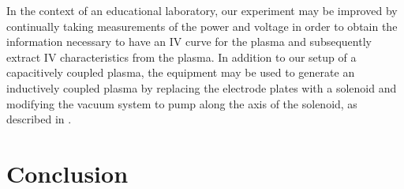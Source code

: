 \documentclass[reprint]{revtex4-1}
\begin{document}
In the context of an educational laboratory, our experiment may be improved by continually taking measurements of the power and voltage in order to obtain the information necessary to have an IV curve for the plasma and subsequently extract IV characteristics from the plasma. In addition to our setup of a capacitively coupled plasma,  the equipment may be used to generate an inductively coupled plasma by replacing the electrode plates with a solenoid and modifying the vacuum system to pump along the axis of the solenoid, as described in \cite{physics-radio-frequency,Jiayin2010}. 

\section{Conclusion}


\end{document}
